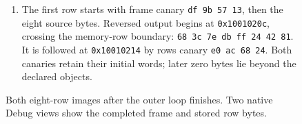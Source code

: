 \begin{figure}[htbp]
\begin{minipage}{\linewidth}
\begin{enumerate}
      \item The first row starts with frame canary \texttt{df 9b 57 13}, then the eight source bytes. Reversed output begins at \texttt{0x1001020c}, crossing the memory-row boundary: \texttt{68 3c 7e db ff 24 42 81}. It is followed at \texttt{0x10010214} by rows canary \texttt{e0 ac 68 24}. Both canaries retain their initial words; later zero bytes lie beyond the declared objects.
    \end{enumerate}
  \end{minipage}
  \caption{Both eight-row images after the outer loop finishes. Two native Debug views show the completed frame and stored row bytes.}
  \label{capture:003-eight-byte-sprite-f04-complete-sprite}
\end{figure}
\par
